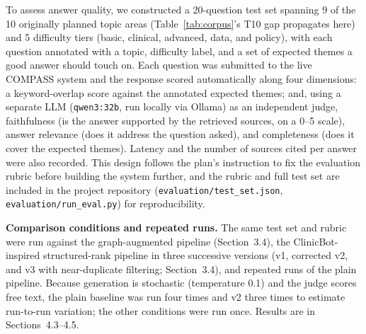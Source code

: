 \documentclass[11pt]{article}
\begin{document}
To assess answer quality, we constructed a 20-question test set spanning 9 of the 10 originally planned topic areas (Table~\ref{tab:corpus}'s T10 gap propagates here) and 5 difficulty tiers (basic, clinical, advanced, data, and policy), with each question annotated with a topic, difficulty label, and a set of expected themes a good answer should touch on. Each question was submitted to the live COMPASS system and the response scored automatically along four dimensions: a keyword-overlap score against the annotated expected themes; and, using a separate LLM (\texttt{qwen3:32b}, run locally via Ollama) as an independent judge, faithfulness (is the answer supported by the retrieved sources, on a 0--5 scale), answer relevance (does it address the question asked), and completeness (does it cover the expected themes). Latency and the number of sources cited per answer were also recorded. This design follows the plan's instruction to fix the evaluation rubric before building the system further, and the rubric and full test set are included in the project repository (\texttt{evaluation/test\_set.json}, \texttt{evaluation/run\_eval.py}) for reproducibility.

\textbf{Comparison conditions and repeated runs.} The same test set and rubric were run against the graph-augmented pipeline (Section~3.4), the ClinicBot-inspired structured-rank pipeline in three successive versions (v1, corrected v2, and v3 with near-duplicate filtering; Section~3.4), and repeated runs of the plain pipeline. Because generation is stochastic (temperature 0.1) and the judge scores free text, the plain baseline was run four times and v2 three times to estimate run-to-run variation; the other conditions were run once. Results are in Sections~4.3--4.5.
\end{document}
